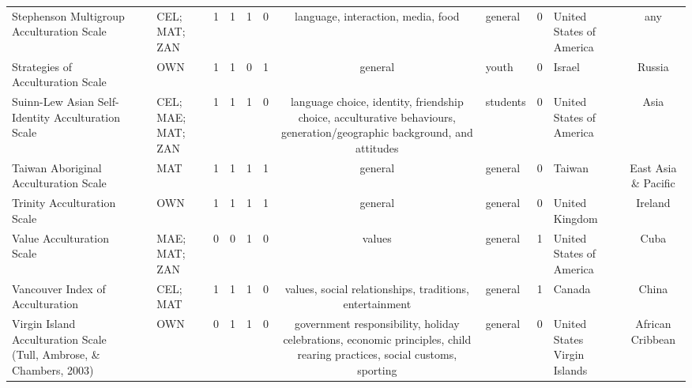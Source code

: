\begin{longtable}[l]{lclclclclclc}
Stephenson Multigroup Acculturation Scale & \ \citet{Stephenson2000} & CEL; MAT; ZAN & 1 & 1 & 1 & 0 & language, interaction, media, food & general & 0 & United States of America & any\\
Strategies of Acculturation Scale & \ \citet{Eshel2000} & OWN & 1 & 1 & 0 & 1 & general & youth & 0 & Israel & Russia\\
Suinn-Lew Asian Self-Identity Acculturation Scale & \ \citet{Suinn1992} & CEL; MAE; MAT; ZAN & 1 & 1 & 1 & 0 & language choice, identity, friendship choice, acculturative behaviours, generation/geographic background, and attitudes & students & 0 & United States of America & Asia\\
Taiwan Aboriginal Acculturation Scale & \ \citet{Cheng1995} & MAT & 1 & 1 & 1 & 1 & general & general & 0 & Taiwan & East Asia \& Pacific\\
Trinity Acculturation Scale & \ \citet{Curran2003} & OWN & 1 & 1 & 1 & 1 & general & general & 0 & United Kingdom & Ireland\\
Value Acculturation Scale & \ \citet{Szapocznik1978} & MAE; MAT; ZAN & 0 & 0 & 1 & 0 & values & general & 1 & United States of America & Cuba\\
Vancouver Index of Acculturation & \ \citet{Ryder2000} & CEL; MAT & 1 & 1 & 1 & 0 & values, social relationships, traditions, entertainment & general & 1 & Canada & China\\
Virgin Island Acculturation Scale (Tull, Ambrose, \& Chambers, 2003) & \ \citet{Tull2003} & OWN & 0 & 1 & 1 & 0 & government responsibility, holiday celebrations, economic principles, child rearing practices, social customs, sporting & general & 0 & United States Virgin Islands & African Cribbean\\*
\end{longtable}
